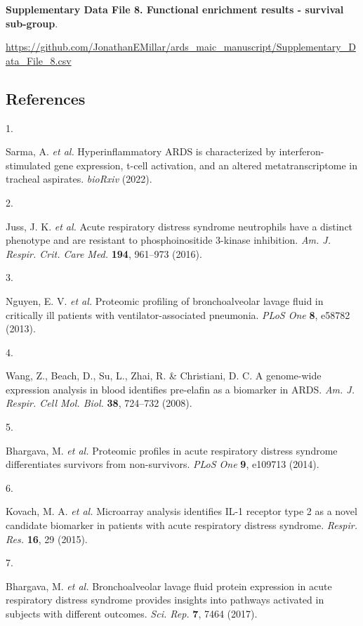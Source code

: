\documentclass[
  11,
  a4paper,
]{article}
\newlength{\cslhangindent}
\newlength{\csllabelwidth}
\newenvironment{CSLReferences}[2] %
 {\begin{list}{}{%
  \setlength{\itemindent}{0pt}
  \setlength{\leftmargin}{0pt}
  \setlength{\parsep}{0pt}
  \ifodd #1
   \setlength{\leftmargin}{\cslhangindent}
   \setlength{\itemindent}{-1\cslhangindent}
  \fi
  \setlength{\itemsep}{#2\baselineskip}}}
 {\end{list}}
\newcommand{\CSLLeftMargin}[1]{\parbox[t]{\csllabelwidth}{\strut#1\strut}}
\newcommand{\CSLRightInline}[1]{\parbox[t]{\linewidth - \csllabelwidth}{\strut#1\strut}}
\begin{document}
\textbf{Supplementary Data File 8. Functional enrichment results -
survival sub-group}.

\url{https://github.com/JonathanEMillar/ards_maic_manuscript/Supplementary_Data_File_8.csv}

\newpage

\subsection{References}\label{references}

\label{refs}
\begin{CSLReferences}{0}{0}
\CSLLeftMargin{1. }%
\CSLRightInline{Sarma, A. \emph{et al.} Hyperinflammatory {ARDS} is
characterized by interferon-stimulated gene expression, t-cell
activation, and an altered metatranscriptome in tracheal aspirates.
\emph{bioRxiv} (2022).}

\CSLLeftMargin{2. }%
\CSLRightInline{Juss, J. K. \emph{et al.} Acute respiratory distress
syndrome neutrophils have a distinct phenotype and are resistant to
phosphoinositide 3-kinase inhibition. \emph{Am. J. Respir. Crit. Care
Med.} \textbf{194}, 961--973 (2016).}

\CSLLeftMargin{3. }%
\CSLRightInline{Nguyen, E. V. \emph{et al.} Proteomic profiling of
bronchoalveolar lavage fluid in critically ill patients with
ventilator-associated pneumonia. \emph{PLoS One} \textbf{8}, e58782
(2013).}

\CSLLeftMargin{4. }%
\CSLRightInline{Wang, Z., Beach, D., Su, L., Zhai, R. \& Christiani, D.
C. A genome-wide expression analysis in blood identifies pre-elafin as a
biomarker in {ARDS}. \emph{Am. J. Respir. Cell Mol. Biol.} \textbf{38},
724--732 (2008).}

\CSLLeftMargin{5. }%
\CSLRightInline{Bhargava, M. \emph{et al.} Proteomic profiles in acute
respiratory distress syndrome differentiates survivors from
non-survivors. \emph{PLoS One} \textbf{9}, e109713 (2014).}

\CSLLeftMargin{6. }%
\CSLRightInline{Kovach, M. A. \emph{et al.} Microarray analysis
identifies {IL-1} receptor type 2 as a novel candidate biomarker in
patients with acute respiratory distress syndrome. \emph{Respir. Res.}
\textbf{16}, 29 (2015).}

\CSLLeftMargin{7. }%
\CSLRightInline{Bhargava, M. \emph{et al.} Bronchoalveolar lavage fluid
protein expression in acute respiratory distress syndrome provides
insights into pathways activated in subjects with different outcomes.
\emph{Sci. Rep.} \textbf{7}, 7464 (2017).}


\end{CSLReferences}
\end{document}
